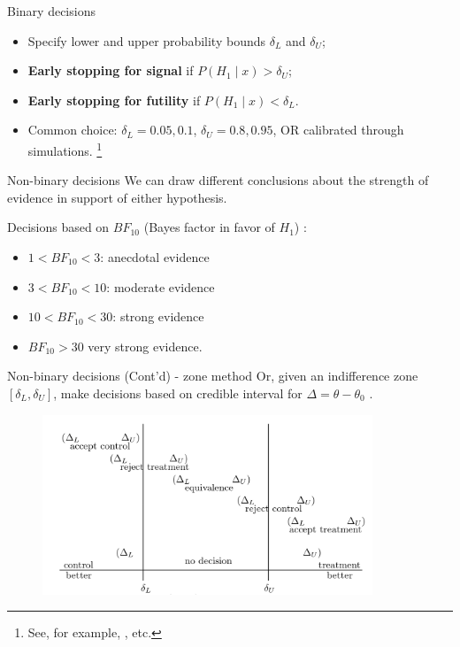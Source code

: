 \documentclass[xcolor=dvipsnames]{beamer}
\begin{document}
\begin{frame}{Binary decisions}
\begin{itemize}
    \item Specify lower and upper probability bounds $\delta_L$ and $\delta_U$;
    \item \textbf{Early stopping for signal} if $P(H_1 \mid x) > \delta_U$;
    \item \textbf{Early stopping for futility} if $P(H_1 \mid x) < \delta_L$. 
    \item Common choice: $\delta_L = 0.05, 0.1$, $\delta_U = 0.8, 0.95$, OR calibrated through simulations.
    \footnote{See, for example, \cite{thall1995bayesian,smith2006implementation,zhou2008bayesian,berry2010bayesian,li2020bayesian}, etc.}
\end{itemize}
    
\end{frame}

\begin{frame}{Non-binary decisions}
We can draw different conclusions about the strength of evidence in support of either hypothesis. 

\vspace{0.2in}
Decisions based on $BF_{10}$ (Bayes factor in favor of $H_1$)
\cite{jeffreys1998theory,kass1995bayes,schonbrodt2017sequential}:
\begin{itemize}
	\item  $1 < BF_{10} < 3$: anecdotal evidence
	\item  $3 < BF_{10} < 10$: moderate evidence
	\item $10 <	BF_{10} < 30$: strong evidence
	\item $BF_{10} > 30$ very strong evidence. 
\end{itemize}
    
\end{frame}

\begin{frame}{Non-binary decisions (Cont'd) - zone method}
Or, given an indifference zone $[\delta_L, \delta_U]$,  make decisions based on credible interval for $\Delta = \theta - \theta_0$ \cite{berry2010bayesian}. 

\begin{figure}
    \centering
    \includegraphics[width=0.88\textwidth]{figures/Bayeisan-zone-method-stopping-rules.png}
\end{figure}
\end{frame}
\end{document}
